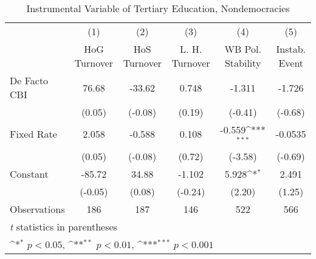 \begin{table}[htbp]\centering
\def\sym#1{\ifmmode^{#1}\else\(^{#1}\)\fi}
\caption{Instrumental Variable of Tertiary Education, Nondemocracies \label{ndemIfivs2}}
\begin{tabular}{l*{5}{c}}
\toprule
                                        &\multicolumn{1}{c}{(1)}&\multicolumn{1}{c}{(2)}&\multicolumn{1}{c}{(3)}&\multicolumn{1}{c}{(4)}&\multicolumn{1}{c}{(5)}\\
                                        &\multicolumn{1}{c}{HoG Turnover}&\multicolumn{1}{c}{HoS Turnover}&\multicolumn{1}{c}{L. H. Turnover}&\multicolumn{1}{c}{WB Pol. Stability}&\multicolumn{1}{c}{Instab. Event}\\
\midrule
De Facto CBI                            &    76.68         &   -33.62         &    0.748         &   -1.311         &   -1.726         \\
                                        &   (0.05)         &  (-0.08)         &   (0.19)         &  (-0.41)         &  (-0.68)         \\
\addlinespace
Fixed Rate                              &    2.058         &   -0.588         &    0.108         &   -0.559\sym{***}&  -0.0535         \\
                                        &   (0.05)         &  (-0.08)         &   (0.72)         &  (-3.58)         &  (-0.69)         \\
\addlinespace
Constant                                &   -85.72         &    34.88         &   -1.102         &    5.928\sym{*}  &    2.491         \\
                                        &  (-0.05)         &   (0.08)         &  (-0.24)         &   (2.20)         &   (1.25)         \\
\midrule
Observations                            &      186         &      187         &      146         &      522         &      566         \\
\bottomrule
\multicolumn{6}{l}{\footnotesize \textit{t} statistics in parentheses}\\
\multicolumn{6}{l}{\footnotesize \sym{*} \(p<0.05\), \sym{**} \(p<0.01\), \sym{***} \(p<0.001\)}\\
\end{tabular}
\end{table}

